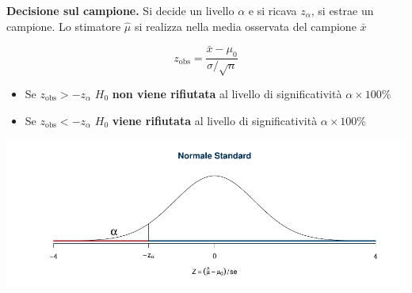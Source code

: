 \documentclass[
  11pt,
]{book}
\providecommand{\tightlist}{%
  \setlength{\itemsep}{0pt}\setlength{\parskip}{0pt}}
\theoremstyle{mytheoremstyle}
\theoremstyle{mydefstyle}
\begin{document}
\begin{info}

\textbf{Decisione sul campione.} Si decide un livello \(\alpha\) e si ricava
\(z_\alpha\), si estrae un campione. Lo stimatore \(\hat\mu\) si realizza
nella media osservata del campione \(\bar x\)

\[z_{\text{obs}}=\frac{\bar x -\mu_0}{\sigma/\sqrt n}\]

\begin{itemize}
\tightlist
\item
  Se \(z_{\text{obs}}>-z_\alpha\) \(H_0\) \textbf{non viene rifiutata} al
  livello di significatività \(\alpha\times100\%\)
\item
  Se \(z_{\text{obs}}<-z_\alpha\) \(H_0\) \textbf{viene rifiutata} al livello
  di significatività \(\alpha\times100\%\)
\end{itemize}

\begin{center}\includegraphics{Appunti_di_Statistica_2025_files/figure-latex/15-test-mu-pi-17-1} \end{center}

\end{info}
\end{document}
